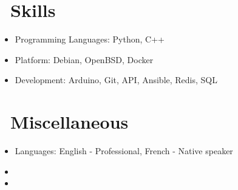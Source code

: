 \documentclass{resume}
\begin{document}
\section{\faCogs\ Skills}
\begin{itemize}[parsep=0.5ex]
  \item Programming Languages: Python, C++
  \item Platform: Debian, OpenBSD, Docker
  \item Development: Arduino, Git, API, Ansible, Redis, SQL
\end{itemize}

\section{\faInfo\ Miscellaneous}
\begin{itemize}[parsep=0.5ex]
  \item Languages: English - Professional, French - Native speaker
  \item {}
  \item {}
\end{itemize}
\end{document}
